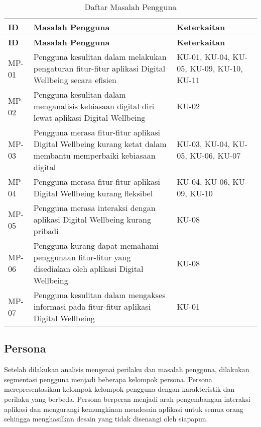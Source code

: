 \RaggedLeft
\begin{small}
\begin{longtable}[c]{|W{c}{0.08\textwidth}|>{\ccnormspacing}m{0.6\textwidth}|>{\ccnormspacingcenter}m{0.2\textwidth}|}
  \caption{Daftar Masalah Pengguna}
  \label{tab:daftar_masalah} \\
  \hline {}
  \textbf{ID} & \centering\textbf{Masalah Pengguna} & \textbf{Keterkaitan} \\ \hline \endfirsthead
  \hline {}
  \textbf{ID} & \centering\textbf{Masalah Pengguna} & \textbf{Keterkaitan} \\ \hline \endhead

  \hline \endfoot

  MP-01  & Pengguna kesulitan dalam melakukan pengaturan fitur-fitur aplikasi Digital Wellbeing secara efisien & KU-01, KU-04, KU-05, KU-09, KU-10, KU-11 \\ \hline
  MP-02  & Pengguna kesulitan dalam menganalisis kebiasaan digital diri lewat aplikasi Digital Wellbeing & KU-02 \\ \hline
  MP-03  & Pengguna merasa fitur-fitur aplikasi Digital Wellbeing kurang ketat dalam membantu memperbaiki kebiasaan digital & KU-03, KU-04, KU-05, KU-06, KU-07 \\ \hline
  MP-04  & Pengguna merasa fitur-fitur aplikasi Digital Wellbeing kurang fleksibel & KU-04, KU-06, KU-09, KU-10 \\ \hline
  MP-05  & Pengguna merasa interaksi dengan aplikasi Digital Wellbeing kurang pribadi & KU-08 \\ \hline
  MP-06  & Pengguna kurang dapat memahami penggunaan fitur-fitur yang disediakan oleh aplikasi Digital Wellbeing & KU-08 \\ \hline
  MP-07  & Pengguna kesulitan dalam mengakses informasi pada fitur-fitur aplikasi Digital Wellbeing & KU-01 \\ \hline
\end{longtable}
\end{small}
\justifying
\FloatBarrier



\subsection{Persona}
\label{subsec:persona_pengguna}
Setelah dilakukan analisis mengenai perilaku dan masalah pengguna, dilakukan segmentasi pengguna menjadi beberapa kelompok persona. Persona merepresentasikan kelompok-kelompok pengguna dengan karakteristik dan perilaku yang berbeda. Persona berperan menjadi arah pengembangan interaksi aplikasi dan mengurangi kemungkinan mendesain aplikasi untuk semua orang sehingga menghasilkan desain yang tidak disenangi oleh siapapun. \parencite{cooper2014face}

